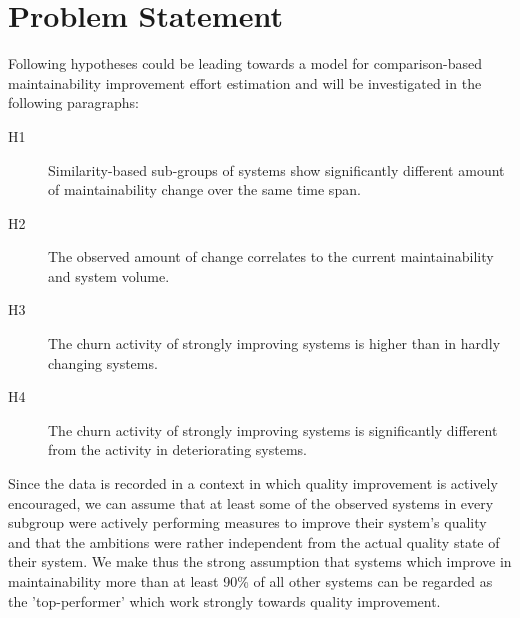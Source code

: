 \section{Problem Statement} 
\label{sec:ProblemStatement}
Following hypotheses could be leading towards a model for comparison-based maintainability improvement effort estimation and will be investigated in the following paragraphs:

\begin{description}
  \item[H1] Similarity-based sub-groups of systems show significantly different amount of maintainability change over the same time span.
  \item[H2] The observed amount of change correlates to the
current maintainability and system volume.
 \item[H3] The churn activity of strongly improving systems is higher than in hardly changing systems.
 \item[H4] The churn activity of strongly improving systems is significantly different from the activity in deteriorating systems.
\end{description}

Since the data is recorded in a context in which quality improvement is actively encouraged, we can assume that at least some of the observed systems in every subgroup were actively performing measures to improve their system's quality and that the ambitions were rather independent from the actual quality state of their system. We make thus the strong assumption that systems which improve in maintainability more than at least 90\% of all other systems can be regarded as the 'top-performer' which work strongly towards quality improvement. 
